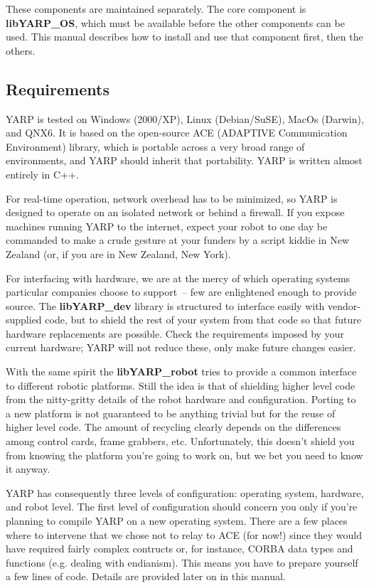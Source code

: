 These components are maintained separately.  The core component
is {\bf libYARP\_OS}, which must be available before the other 
components can be used.  This manual describes how to install and
use that component first, then the others.



\subsection{Requirements}

YARP is tested on Windows (2000/XP), Linux (Debian/SuSE), MacOs (Darwin), and QNX6.
It is based on the open-source ACE (ADAPTIVE Communication
Environment) library, which is portable across a very broad range of
environments, and YARP should inherit that portability. YARP is written almost 
entirely in C++.

For real-time operation, network overhead has to be minimized, so YARP
is designed to operate on an isolated network or behind a firewall.
If you expose machines running YARP to the internet, expect your robot
to one day be commanded to make a crude gesture at your funders by a
script kiddie in New Zealand (or, if you are in New Zealand, New
York).

For interfacing with hardware, we are at the mercy of which operating
systems particular companies choose to support~-- few are enlightened
enough to provide source.  The {\bf libYARP\_dev} library is structured
to interface easily with vendor-supplied code, but to shield the rest
of your system from that code so that future hardware replacements
are possible.  Check the requirements imposed by your current hardware;
YARP will not reduce these, only make future changes easier.

With the same spirit the {\bf libYARP\_robot} tries to provide a common interface to different robotic platforms. Still the idea is that of shielding higher level code from the nitty-gritty details of the robot hardware and configuration. Porting to a new platform is not guaranteed to be anything trivial but for the reuse of higher level code. The amount of recycling clearly depends on the differences among control cards, frame grabbers, etc. Unfortunately, this doesn't shield you from knowing the platform you're going to work on, but we bet you need to know it anyway.


YARP has consequently three levels of configuration: operating system, hardware, and robot level. The first level of configuration should concern you only if you're planning to compile YARP on a new operating system. There are a few places where to intervene that we chose not to relay to ACE (for now!) since they would have required fairly complex contructs or, for instance, CORBA data types and functions (e.g. dealing with endianism). This means you have to prepare yourself a few lines of code. Details are provided later on in this manual.

